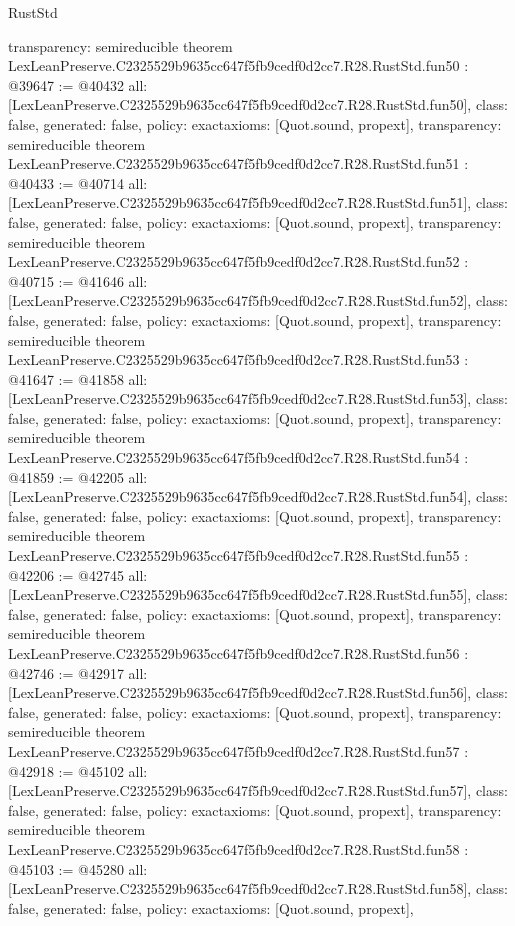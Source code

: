 \begin{lexlean}{RustStd}
\begin{coremodule}
{  transparency: semireducible
}
theorem LexLeanPreserve.C2325529b9635cc647f5fb9cedf0d2cc7.R28.RustStd.fun50 : @39647 := @40432 {
  all: [LexLeanPreserve.C2325529b9635cc647f5fb9cedf0d2cc7.R28.RustStd.fun50],
  class: false,
  generated: false,
  policy: exact{axioms: [Quot.sound, propext]},
  transparency: semireducible
}
theorem LexLeanPreserve.C2325529b9635cc647f5fb9cedf0d2cc7.R28.RustStd.fun51 : @40433 := @40714 {
  all: [LexLeanPreserve.C2325529b9635cc647f5fb9cedf0d2cc7.R28.RustStd.fun51],
  class: false,
  generated: false,
  policy: exact{axioms: [Quot.sound, propext]},
  transparency: semireducible
}
theorem LexLeanPreserve.C2325529b9635cc647f5fb9cedf0d2cc7.R28.RustStd.fun52 : @40715 := @41646 {
  all: [LexLeanPreserve.C2325529b9635cc647f5fb9cedf0d2cc7.R28.RustStd.fun52],
  class: false,
  generated: false,
  policy: exact{axioms: [Quot.sound, propext]},
  transparency: semireducible
}
theorem LexLeanPreserve.C2325529b9635cc647f5fb9cedf0d2cc7.R28.RustStd.fun53 : @41647 := @41858 {
  all: [LexLeanPreserve.C2325529b9635cc647f5fb9cedf0d2cc7.R28.RustStd.fun53],
  class: false,
  generated: false,
  policy: exact{axioms: [Quot.sound, propext]},
  transparency: semireducible
}
theorem LexLeanPreserve.C2325529b9635cc647f5fb9cedf0d2cc7.R28.RustStd.fun54 : @41859 := @42205 {
  all: [LexLeanPreserve.C2325529b9635cc647f5fb9cedf0d2cc7.R28.RustStd.fun54],
  class: false,
  generated: false,
  policy: exact{axioms: [Quot.sound, propext]},
  transparency: semireducible
}
theorem LexLeanPreserve.C2325529b9635cc647f5fb9cedf0d2cc7.R28.RustStd.fun55 : @42206 := @42745 {
  all: [LexLeanPreserve.C2325529b9635cc647f5fb9cedf0d2cc7.R28.RustStd.fun55],
  class: false,
  generated: false,
  policy: exact{axioms: [Quot.sound, propext]},
  transparency: semireducible
}
theorem LexLeanPreserve.C2325529b9635cc647f5fb9cedf0d2cc7.R28.RustStd.fun56 : @42746 := @42917 {
  all: [LexLeanPreserve.C2325529b9635cc647f5fb9cedf0d2cc7.R28.RustStd.fun56],
  class: false,
  generated: false,
  policy: exact{axioms: [Quot.sound, propext]},
  transparency: semireducible
}
theorem LexLeanPreserve.C2325529b9635cc647f5fb9cedf0d2cc7.R28.RustStd.fun57 : @42918 := @45102 {
  all: [LexLeanPreserve.C2325529b9635cc647f5fb9cedf0d2cc7.R28.RustStd.fun57],
  class: false,
  generated: false,
  policy: exact{axioms: [Quot.sound, propext]},
  transparency: semireducible
}
theorem LexLeanPreserve.C2325529b9635cc647f5fb9cedf0d2cc7.R28.RustStd.fun58 : @45103 := @45280 {
  all: [LexLeanPreserve.C2325529b9635cc647f5fb9cedf0d2cc7.R28.RustStd.fun58],
  class: false,
  generated: false,
  policy: exact{axioms: [Quot.sound, propext]},
}
\end{coremodule}
\end{lexlean}
